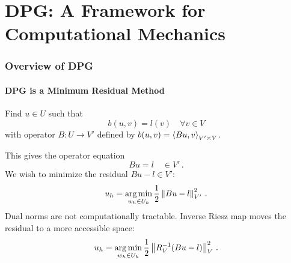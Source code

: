 \documentclass[18pt,xcolor=table]{beamer}
\begin{document}
%                                                                                                                      
%                                                                                                                      
% 
\section{DPG: A Framework for Computational Mechanics}
\begin{frame}[t]
\frametitle{Overview of DPG}
\framesubtitle{DPG is a Minimum Residual Method}
Find $u\in U$ such that
\[
b(u,v)=l(v)\quad\forall v\in V
\]
with operator $B:U\rightarrow V'$ defined by $b(u,v)=\left\langle Bu,v \right\rangle_{V'\times V}$.

This gives the operator equation 
\[
Bu=l\quad\in V'\,.
\]
We wish to minimize the residual $Bu-l\in V'$:
\[
u_h=\operatorname*{arg\,min}_{w_h\in U_h}\frac{1}{2}\left\| Bu-l \right\|^2_{V'}\,.
\]
Dual norms are not computationally tractable. 
Inverse Riesz map moves the residual to a more accessible space:
\[
u_h=\operatorname*{arg\,min}_{w_h\in U_h}\frac{1}{2}\left\| R_V^{-1}(Bu-l) \right\|^2_{V}\,.
\]
\end{frame}
\end{document}
